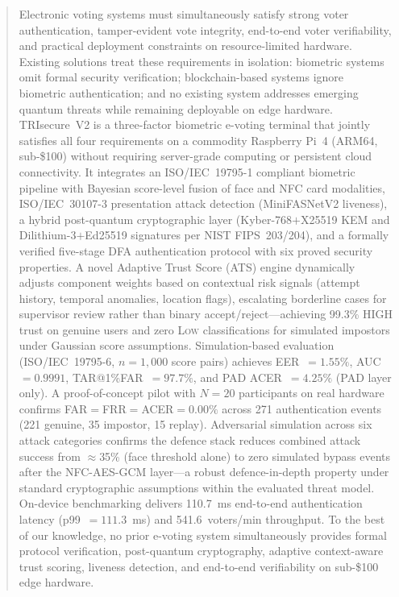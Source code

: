 \documentclass[conference]{IEEEtran}
\begin{document}
\begin{abstract}
Electronic voting systems must simultaneously satisfy strong voter
authentication, tamper-evident vote integrity, end-to-end voter
verifiability, and practical deployment constraints on resource-limited
hardware. Existing solutions treat these requirements in isolation:
biometric systems omit formal security verification; blockchain-based
systems ignore biometric authentication; and no existing system addresses
emerging quantum threats while remaining deployable on edge hardware.
TRIsecure~V2 is a three-factor biometric e-voting terminal that jointly
satisfies all four requirements on a commodity Raspberry Pi~4 (ARM64,
sub-\$100) without requiring server-grade computing or persistent cloud
connectivity. It integrates an ISO/IEC~19795-1 compliant biometric pipeline
with Bayesian score-level fusion of face and NFC card modalities,
ISO/IEC~30107-3 presentation attack detection (MiniFASNetV2 liveness),
a hybrid post-quantum cryptographic layer (Kyber-768\(+\)X25519 KEM and
Dilithium-3\(+\)Ed25519 signatures per NIST FIPS~203/204), and a formally
verified five-stage DFA authentication protocol with six proved security
properties. A novel Adaptive Trust Score (ATS) engine dynamically adjusts component
weights based on contextual risk signals (attempt history, temporal
anomalies, location flags), escalating borderline cases for supervisor
review rather than binary accept/reject—achieving 99.3\% HIGH trust on
genuine users and zero \textsc{Low} classifications for simulated impostors
under Gaussian score assumptions.
Simulation-based evaluation (ISO/IEC~19795-6, \(n{=}1{,}000\)
score pairs) achieves EER~\(=1.55\%\), AUC~\(=0.9991\),
TAR@1\%FAR~\(=97.7\%\), and PAD ACER~\(=4.25\%\) (PAD layer only).
A proof-of-concept pilot with \(N{=}20\) participants on real hardware
confirms FAR\(=\)FRR\(=\)ACER\(=0.00\%\) across 271 authentication
events (221 genuine, 35 impostor, 15 replay).
Adversarial simulation across six attack categories confirms the
defence stack reduces combined attack success from \(\approx\)35\% (face
threshold alone) to zero simulated bypass events after the NFC-AES-GCM
layer—a robust defence-in-depth property under standard cryptographic
assumptions within the evaluated threat model.
On-device benchmarking delivers 110.7~ms end-to-end authentication latency
(p99~\(=111.3\)~ms) and 541.6~voters/min throughput. To the best of our knowledge, no prior e-voting system simultaneously
provides formal protocol verification,
post-quantum cryptography, adaptive context-aware trust scoring, liveness
detection, and end-to-end verifiability on sub-\$100 edge hardware.
\end{abstract}
\end{document}
